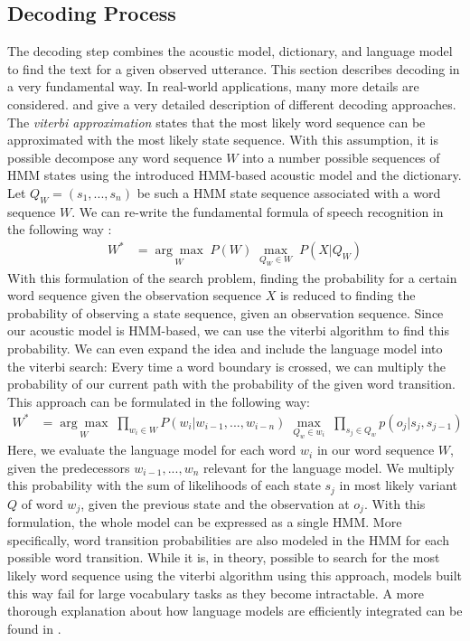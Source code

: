 \subsection{Decoding Process}
The decoding step combines the acoustic model, dictionary, and language model to find the text for a given observed utterance. This section describes decoding in a very fundamental way. In real-world applications, many more details are considered. \cite{huang2001spoken} and \cite{yu2016automatic} give a very detailed description of different decoding approaches.\\
The \textit{viterbi approximation} \cite{huang2001spoken} states that the most likely word sequence can be approximated with the most likely state sequence. With this assumption, it is possible decompose any word sequence $W$ into a number possible sequences of HMM states using the introduced HMM-based acoustic model and the dictionary. Let $Q_W = (s_1, ..., s_n)$ be such a HMM state sequence associated with a word sequence $W$. We can re-write the fundamental formula of speech recognition in the following way \cite{demuynck2002doing}: 
\begin{align*}
W^* &= \underset{W}{\arg \max} \; P(W) \; \underset{Q_W \in W}{\max} \; P(X|Q_W)
\end{align*}
With this formulation of the search problem, finding the probability for a certain word sequence given the observation sequence $X$ is reduced to finding the probability of observing a state sequence, given an observation sequence. Since our acoustic model is HMM-based, we can use the viterbi algorithm to find this probability. We can even expand the idea and include the language model into the viterbi search: Every time a word boundary is crossed, we can multiply the probability of our current path with the probability of the given word transition. This approach can be formulated in the following way: 
\begin{align}
W^* &= \underset{W}{\arg \max} \; \prod_{w_i \in W} P(w_i|w_{i - 1},...,w_{i - n}) \; \underset{Q_w \in w_i}{\max} \; \prod_{s_j \in Q_w} p(o_j | s_j, s_{j - 1})
\label{eq:state_based_viterbi_approximation}
\end{align}
Here, we evaluate the language model for each word $w_i$ in our word sequence $W$, given the predecessors $w_{i - 1},...,w_n$ relevant for the language model. We multiply this probability with the sum of likelihoods of each state $s_j$ in most likely variant $Q$ of word $w_j$, given the previous state and the observation at $o_j$. With this formulation, the whole model can be expressed as a single HMM. More specifically, word transition probabilities are also modeled in the HMM for each possible word transition. While it is, in theory, possible to search for the most likely word sequence using the viterbi algorithm using this approach, models built this way fail for large vocabulary tasks as they become intractable. A more thorough explanation about how language models are efficiently integrated can be found in \cite{schukat1995automatische}. \\ 
